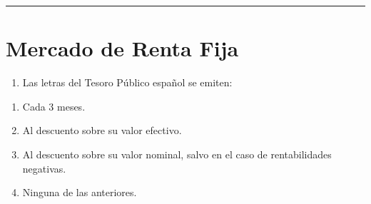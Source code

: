 \documentclass[
  letterpaper,
  DIV=11,
  numbers=noendperiod]{scrreprt}
\providecommand{\tightlist}{%
  \setlength{\itemsep}{0pt}\setlength{\parskip}{0pt}}\usepackage{longtable,booktabs,array}
\begin{document}
\begin{center}\rule{0.5\linewidth}{0.5pt}\end{center}

\hypertarget{mercado-de-renta-fija}{%
\section*{Mercado de Renta Fija}\label{mercado-de-renta-fija}}


\begin{enumerate}
\def\labelenumi{\arabic{enumi}.}
\tightlist
\item
  Las letras del Tesoro Público español se emiten:
\end{enumerate}

\begin{enumerate}
\def\labelenumi{\alph{enumi}.}
\item
  Cada 3 meses.
\item
  Al descuento sobre su valor efectivo.
\item
  Al descuento sobre su valor nominal, salvo en el caso de
  rentabilidades negativas.
\item
  Ninguna de las anteriores.
\end{enumerate}
\end{document}
